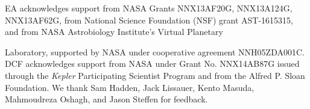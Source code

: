\documentclass[graybox,natbib,nosecnum]{svmult}
\begin{document}
\begin{acknowledgement}
EA acknowledges support from NASA Grants NNX13AF20G, NNX13A124G, NNX13AF62G, from National Science Foundation (NSF) grant AST-1615315, and from NASA Astrobiology Institute's Virtual Planetary

Laboratory, supported by NASA under cooperative agreement NNH05ZDA001C.  DCF acknowledges support from NASA under Grant No. NNX14AB87G issued through the \emph{Kepler} Participating Scientist Program and from the Alfred P. Sloan Foundation.  We thank Sam Hadden, Jack Lissauer, Kento Masuda, Mahmoudreza Oshagh, and Jason Steffen for feedback.
\end{acknowledgement}

\end{document}
